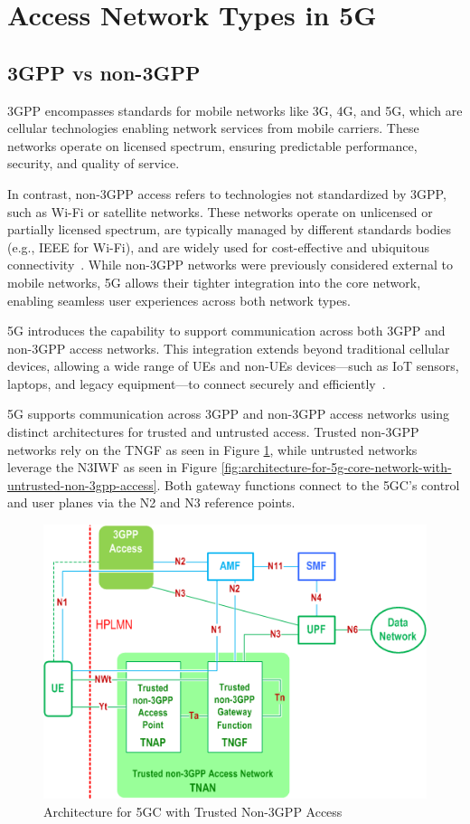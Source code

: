 \section{Access Network Types in \acs{5G}}

\subsection{\acs{3GPP} vs non-\acs{3GPP}}
\ac{3GPP} encompasses standards for mobile networks like \ac{3G}, \ac{4G}, and \ac{5G}, which are cellular technologies enabling network services from mobile carriers. These networks operate on licensed spectrum, ensuring predictable performance, security, and quality of service.

In contrast, non-\ac{3GPP} access refers to technologies not standardized by \ac{3GPP}, such as Wi-Fi or satellite networks. These networks operate on unlicensed or partially licensed spectrum, are typically managed by different standards bodies (e.g., IEEE for Wi-Fi), and are widely used for cost-effective and ubiquitous connectivity~\cite{wba-04-2023-p3}. While non-\ac{3GPP} networks were previously considered external to mobile networks, \ac{5G} allows their tighter integration into the core network, enabling seamless user experiences across both network types.

\ac{5G} introduces the capability to support communication across both \ac{3GPP} and non-\ac{3GPP} access networks. This integration extends beyond traditional cellular devices, allowing a wide range of \acp{UE} and non-\acp{UE} devices—such as \ac{IoT} sensors, laptops, and legacy equipment—to connect securely and efficiently~\cite{23.501-p57}.

\ac{5G} supports communication across \ac{3GPP} and non-\ac{3GPP} access networks using distinct architectures for trusted and untrusted access. Trusted non-\ac{3GPP} networks rely on the \ac{TNGF} as seen in Figure \ref{fig:architecture-for-5g-core-network-with-trusted-non-3gpp-access}, while untrusted networks leverage the \ac{N3IWF} as seen in Figure \ref{fig:architecture-for-5g-core-network-with-untrusted-non-3gpp-access}. Both gateway functions connect to the \ac{5GC}’s control and user planes via the N2 and N3 reference points.

\begin{figure}
    \centering
    \includegraphics[width=0.5\linewidth]{figs/architecture-for-5g-core-network-with-trusted-non-3gpp-access.png}
    \caption{Architecture for \acs{5GC} with Trusted Non-\acs{3GPP} Access}
    \label{fig:architecture-for-5g-core-network-with-trusted-non-3gpp-access}
\end{figure}

